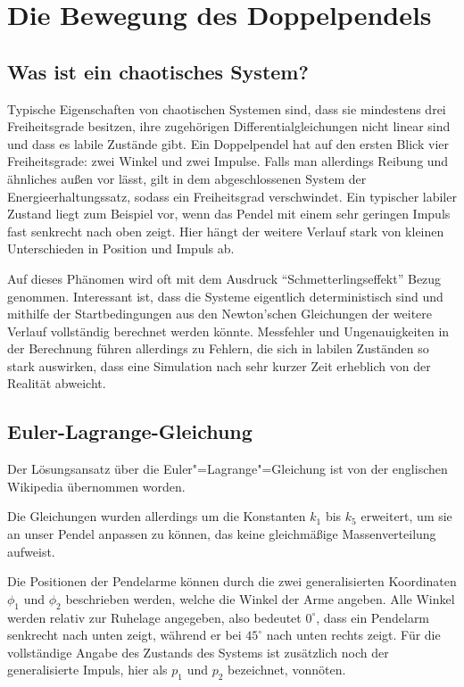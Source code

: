 
\section{Die Bewegung des Doppelpendels}
\subsection{Was ist ein chaotisches System?}
Typische Eigenschaften von chaotischen Systemen sind, dass sie mindestens drei Freiheitsgrade besitzen, ihre zugehörigen Differentialgleichungen nicht linear sind und dass es labile Zustände gibt. \citep{wikichaos}
Ein Doppelpendel hat auf den ersten Blick vier Freiheitsgrade: zwei Winkel und zwei Impulse.
Falls man allerdings Reibung und ähnliches außen vor lässt, gilt in dem abgeschlossenen System der Energieerhaltungssatz, sodass ein Freiheitsgrad verschwindet.
Ein typischer labiler Zustand liegt zum Beispiel vor, wenn das Pendel mit einem sehr geringen Impuls fast senkrecht nach oben zeigt.
Hier hängt der weitere Verlauf stark von kleinen Unterschieden in Position und Impuls ab.

Auf dieses Phänomen wird oft mit dem Ausdruck "`Schmetterlingseffekt"' Bezug genommen.
Interessant ist, dass die Systeme eigentlich deterministisch sind und mithilfe der Startbedingungen aus den Newton'schen Gleichungen der weitere Verlauf vollständig berechnet werden könnte.
Messfehler und Ungenauigkeiten in der Berechnung führen allerdings zu Fehlern, die sich in labilen Zuständen so stark auswirken, dass eine Simulation nach sehr kurzer Zeit erheblich von der Realität abweicht.

\subsection{Euler-Lagrange-Gleichung}
Der Lösungsansatz über die Euler"=Lagrange"=Gleichung ist von der englischen Wikipedia übernommen worden.
\citep{wikidoublependulum}

Die Gleichungen wurden allerdings um die Konstanten $k_1$ bis $k_5$ erweitert, um sie an unser Pendel anpassen zu können, das keine gleichmäßige Massenverteilung aufweist.

Die Positionen der Pendelarme können durch die zwei generalisierten Koordinaten $\phi_1$ und $\phi_2$ beschrieben werden, welche die Winkel der Arme angeben.
Alle Winkel werden relativ zur Ruhelage angegeben, also bedeutet $0^\circ$, dass ein Pendelarm senkrecht nach unten zeigt, während er bei $45^\circ$ nach unten rechts zeigt.
Für die vollständige Angabe des Zustands des Systems ist zusätzlich noch der generalisierte Impuls, hier als $p_1$ und $p_2$ bezeichnet, vonnöten.


